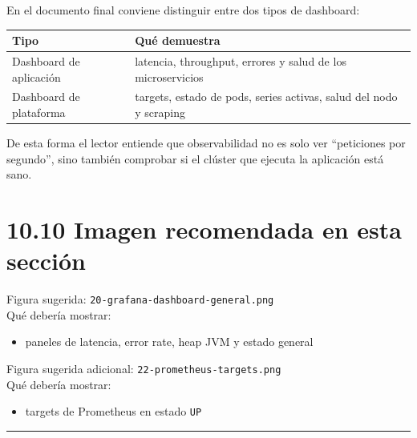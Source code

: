 \documentclass[
a4paper,
12pt]{report}
\providecommand{\tightlist}{%
  \setlength{\itemsep}{0pt}\setlength{\parskip}{0pt}}
\begin{document}
En el documento final conviene distinguir entre dos tipos de dashboard:

{\def\LTcaptype{table} %
\begin{longtable}[]{@{}
  >{\raggedright\arraybackslash}p{}
  >{\raggedright\arraybackslash}p{}@{}}
\toprule\noalign{}
\begin{minipage}[b]{\linewidth}\raggedright
Tipo
\end{minipage} & \begin{minipage}[b]{\linewidth}\raggedright
Qué demuestra
\end{minipage} \\
\midrule\noalign{}
\endhead
\bottomrule\noalign{}
\endlastfoot
Dashboard de aplicación & latencia, throughput, errores y salud de los
microservicios \\
Dashboard de plataforma & targets, estado de pods, series activas, salud
del nodo y scraping \\
\end{longtable}
}

De esta forma el lector entiende que observabilidad no es solo ver
``peticiones por segundo'', sino también comprobar si el clúster que
ejecuta la aplicación está sano.

\section{10.10 Imagen recomendada en esta
sección}\label{imagen-recomendada-en-esta-secciuxf3n-4}

Figura sugerida: \texttt{20-grafana-dashboard-general.png}\\
Qué debería mostrar:

\begin{itemize}
\tightlist
\item
  paneles de latencia, error rate, heap JVM y estado general
\end{itemize}

Figura sugerida adicional: \texttt{22-prometheus-targets.png}\\
Qué debería mostrar:

\begin{itemize}
\tightlist
\item
  targets de Prometheus en estado \texttt{UP}
\end{itemize}

\begin{center}\rule{0.5\linewidth}{0.5pt}\end{center}
\end{document}
